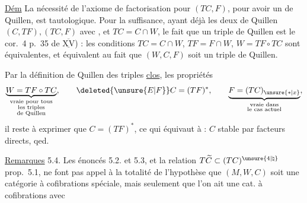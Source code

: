 
\uline{Dém} La nécessité de l'axiome de factorisation
pour $(TC,F)$, pour avoir un  de Quillen,
est tautologique. Pour la suffisance, ayant
déjà les deux  de Quillen $(C,TF),(TC,F)$
avec
, et $TC=C\cap W$, le fait que  
un triple de Quillen est le cor.~4 p.~35
de $\overline{\underline{\mathrm{XV}}}$) : les conditions $TC=C\cap W$, $TF=F\cap W$,
$W=TF\circ TC$ sont équivalentes, et équivalent au
fait que $(W,C,F)$ soit un triple de Quillen.

Par la définition de Quillen des triples \uline{clos},
 les propriétés
\[
\underbrace{W=TF\circ TC}_{\substack{\text{vraie pour tous}\\\text{les triples}\\\text{de Quillen}}},\qquad
\deleted{\unsure{E|F}}C=(TF)^{*},\qquad
\underbrace{F=(TC)_{\unsure{*|x}}}_{\substack{\text{vraie dans}\\\text{le cas actuel}}},
\]
il reste à exprimer que $C=(TF)^{*}$, ce qui
équivaut à : $C$ stable par facteurs directs,
qed.

\uline{Remarques} 5.4. Les  énoncés 5.2. et 5.3,
et la relation $T\widetilde C\subset (TC)^{\unsure{4|\natural}}$  prop.~5.1,
ne font pas appel à la totalité de l'hypothèse que $(M,W,C)$ soit une catégorie à cofibrations spéciale, mais seulement que l'on ait
une cat. à cofibrations avec
\unsure{;|,}

